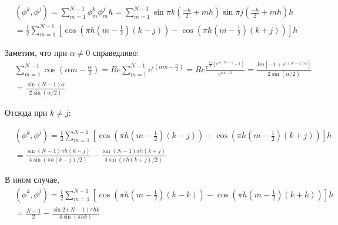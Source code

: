 \documentclass[14pt,a4paper]{extarticle}
\newcommand{\1}{\mathbbm{1}}
\begin{document}
\begin{align*}
    & (\phi^k, \phi^j) = \sum_{m = 1}^{N - 1} \phi_m^k \phi_m^j h 
    = \sum_{m = 1}^{N - 1} \sin{\pi k (\frac{-h}{2} + m h)} \sin{\pi j (\frac{-h}{2} + m h)} h \\ 
    & = \frac{1}{2} \sum_{m = 1}^{N - 1} [ \cos{(\pi h (m - \frac{1}{2})(k - j))} - \cos{(\pi h (m - \frac{1}{2})(k + j))} ] h
\end{align*}

Заметим, что при $\alpha \neq 0$ справедливо:
\begin{align*}
    & \sum_{m = 1}^{N - 1} \cos(\alpha m - \frac{\alpha}{2}) = Re\sum_{m = 1}^{N - 1} e^{i (\alpha m - \frac{\alpha}{2})} 
     = Re \frac{e^{\frac{i \alpha}{2}(e^{i \alpha (N - 1)} - 1)}}{e^{i \alpha - 1}} 
     = \frac{Im [-1 + e^{i (N - 1) \alpha}]}{2 \sin(\alpha/2)} \\
    & = \frac{\sin{(N - 1) \alpha}}{2 \sin(\alpha/2)}
\end{align*}

Отсюда при $k \neq j$:

\begin{align*}
    & (\phi^k, \phi^j) 
    = \frac{1}{2} \sum_{m = 1}^{N - 1} [ \cos{(\pi h (m - \frac{1}{2})(k - j))} - \cos{(\pi h (m - \frac{1}{2})(k + j))} ] h \\
    & = \frac{\sin{(N - 1) \pi h (k - j)}}{4 \sin(\pi h (k - j)/2)} - \frac{\sin{(N - 1) \pi h (k + j)}}{4 \sin(\pi h (k + j)/2)}
\end{align*}

В ином случае, 
\begin{align*}
    & (\phi^k, \phi^j) 
    = \frac{1}{2} \sum_{m = 1}^{N - 1} [ \cos{(\pi h (m - \frac{1}{2})(k - k))} - \cos{(\pi h (m - \frac{1}{2})(k + k))} ] h \\
    & = \frac{N - 1}{2} - \frac{\sin{2 (N - 1) \pi h k}}{4 \sin(\pi h k)}
\end{align*}
\end{document}
